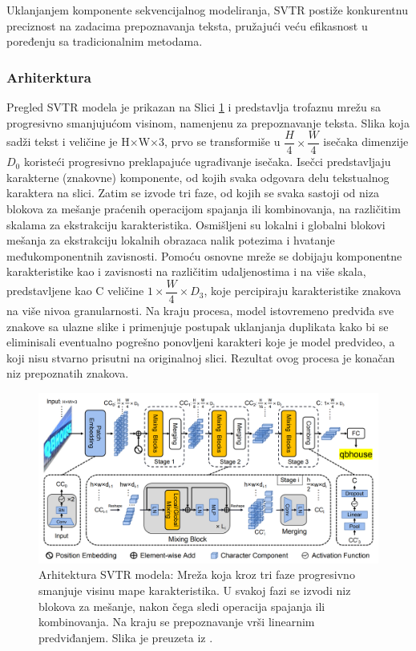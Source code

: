 \documentclass[a4paper,12pt]{article}
\begin{document}
	Uklanjanjem komponente sekvencijalnog modeliranja, SVTR postiže konkurentnu preciznost na zadacima prepoznavanja teksta, pružajući veću efikasnost u poređenju sa tradicionalnim metodama.
	
	\subsubsection{Arhiterktura}

	Pregled SVTR modela je prikazan na Slici \ref{fig:svtr-architecture} i predstavlja trofaznu mrežu sa progresivno smanjujućom visinom, namenjenu za prepoznavanje teksta. Slika koja sadži tekst i veličine je H×W×3, prvo se transformiše u \(\dfrac{H}{4} \times \dfrac{W}{4}\) isečaka dimenzije \(D_0\) koristeći progresivno preklapajuće ugrađivanje isečaka. Isečci predstavljaju karakterne (znakovne) komponente, od kojih svaka odgovara delu tekstualnog karaktera na slici. Zatim se izvode tri faze, od kojih se svaka sastoji od niza blokova za mešanje praćenih operacijom spajanja ili kombinovanja, na različitim skalama za ekstrakciju karakteristika. Osmišljeni su lokalni i globalni blokovi mešanja za ekstrakciju lokalnih obrazaca nalik potezima i hvatanje međukomponentnih zavisnosti. Pomoću osnovne mreže se dobijaju komponentne karakteristike kao i zavisnosti na različitim udaljenostima i na više skala, predstavljene kao C veličine \(1 \times \dfrac{W}{4} \times D_3\), koje percipiraju karakteristike znakova na više nivoa granularnosti. Na kraju procesa, model istovremeno predviđa sve znakove sa ulazne slike i primenjuje postupak uklanjanja duplikata kako bi se eliminisali eventualno pogrešno ponovljeni karakteri koje je model predvideo, a koji nisu stvarno prisutni na originalnoj slici. Rezultat ovog procesa je konačan niz prepoznatih znakova.

	\begin{figure}[H]
		\centering
		\includegraphics[width=\textwidth]{assets/svtr-architecture.png}
		\caption{Arhitektura SVTR modela: Mreža koja kroz tri faze progresivno smanjuje visinu mape karakteristika. U svakoj fazi se izvodi niz blokova za mešanje, nakon čega sledi operacija spajanja ili kombinovanja. Na kraju se prepoznavanje vrši linearnim predviđanjem. Slika je preuzeta iz \cite{du2022svtrscenetextrecognition}.}
		\label{fig:svtr-architecture}
	\end{figure}
	
\end{document}
